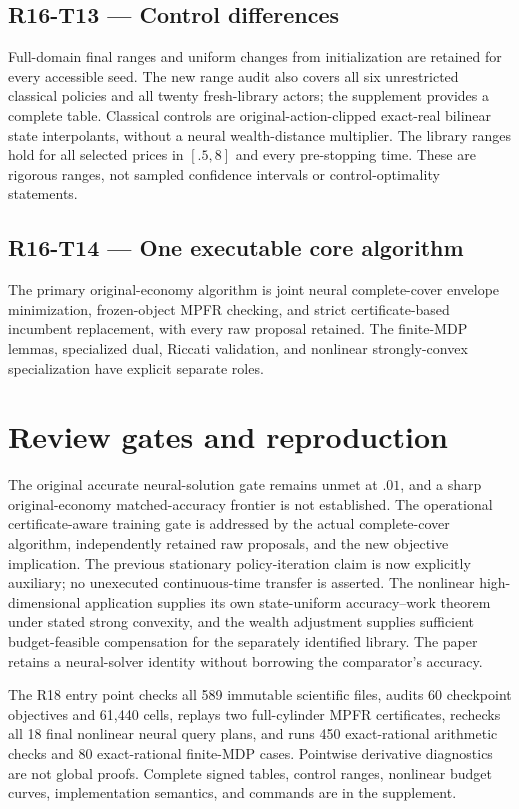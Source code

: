 \documentclass[ecta]{econsocart}
\theoremstyle{remark}
\begin{document}
\subsection{R16-T13 --- Control differences}
Full-domain final ranges and uniform changes from initialization are retained for every accessible seed. The new range audit also covers all six unrestricted classical policies and all twenty fresh-library actors; the supplement provides a complete table. Classical controls are original-action-clipped exact-real bilinear state interpolants, without a neural wealth-distance multiplier. The library ranges hold for all selected prices in $[.5,8]$ and every pre-stopping time. These are rigorous ranges, not sampled confidence intervals or control-optimality statements.

\subsection{R16-T14 --- One executable core algorithm}
The primary original-economy algorithm is joint neural complete-cover envelope minimization, frozen-object MPFR checking, and strict certificate-based incumbent replacement, with every raw proposal retained. The finite-MDP lemmas, specialized dual, Riccati validation, and nonlinear strongly-convex specialization have explicit separate roles.

\section{Review gates and reproduction}
The original accurate neural-solution gate remains unmet at $.01$, and a sharp original-economy matched-accuracy frontier is not established. The operational certificate-aware training gate is addressed by the actual complete-cover algorithm, independently retained raw proposals, and the new objective implication. The previous stationary policy-iteration claim is now explicitly auxiliary; no unexecuted continuous-time transfer is asserted. The nonlinear high-dimensional application supplies its own state-uniform accuracy--work theorem under stated strong convexity, and the wealth adjustment supplies sufficient budget-feasible compensation for the separately identified library. The paper retains a neural-solver identity without borrowing the comparator's accuracy.

The R18 entry point checks all 589 immutable scientific files, audits 60 checkpoint objectives and 61,440 cells, replays two full-cylinder MPFR certificates, rechecks all 18 final nonlinear neural query plans, and runs 450 exact-rational arithmetic checks and 80 exact-rational finite-MDP cases. Pointwise derivative diagnostics are not global proofs. Complete signed tables, control ranges, nonlinear budget curves, implementation semantics, and commands are in the supplement.
\end{document}
